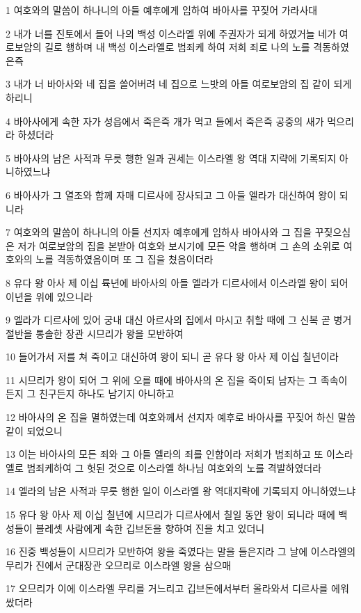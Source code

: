 \par 1 여호와의 말씀이 하나니의 아들 예후에게 임하여 바아사를 꾸짖어 가라사대
\par 2 내가 너를 진토에서 들어 나의 백성 이스라엘 위에 주권자가 되게 하였거늘 네가 여로보암의 길로 행하며 내 백성 이스라엘로 범죄케 하여 저희 죄로 나의 노를 격동하였은즉
\par 3 내가 너 바아사와 네 집을 쓸어버려 네 집으로 느밧의 아들 여로보암의 집 같이 되게 하리니
\par 4 바아사에게 속한 자가 성읍에서 죽은즉 개가 먹고 들에서 죽은즉 공중의 새가 먹으리라 하셨더라
\par 5 바아사의 남은 사적과 무릇 행한 일과 권세는 이스라엘 왕 역대 지략에 기록되지 아니하였느냐
\par 6 바아사가 그 열조와 함께 자매 디르사에 장사되고 그 아들 엘라가 대신하여 왕이 되니라
\par 7 여호와의 말씀이 하나니의 아들 선지자 예후에게 임하사 바아사와 그 집을 꾸짖으심은 저가 여로보암의 집을 본받아 여호와 보시기에 모든 악을 행하며 그 손의 소위로 여호와의 노를 격동하였음이며 또 그 집을 쳤음이더라
\par 8 유다 왕 아사 제 이십 륙년에 바아사의 아들 엘라가 디르사에서 이스라엘 왕이 되어 이년을 위에 있으니라
\par 9 엘라가 디르사에 있어 궁내 대신 아르사의 집에서 마시고 취할 때에 그 신복 곧 병거 절반을 통솔한 장관 시므리가 왕을 모반하여
\par 10 들어가서 저를 쳐 죽이고 대신하여 왕이 되니 곧 유다 왕 아사 제 이십 칠년이라
\par 11 시므리가 왕이 되어 그 위에 오를 때에 바아사의 온 집을 죽이되 남자는 그 족속이든지 그 친구든지 하나도 남기지 아니하고
\par 12 바아사의 온 집을 멸하였는데 여호와께서 선지자 예후로 바아사를 꾸짖어 하신 말씀같이 되었으니
\par 13 이는 바아사의 모든 죄와 그 아들 엘라의 죄를 인함이라 저희가 범죄하고 또 이스라엘로 범죄케하여 그 헛된 것으로 이스라엘 하나님 여호와의 노를 격발하였더라
\par 14 엘라의 남은 사적과 무릇 행한 일이 이스라엘 왕 역대지략에 기록되지 아니하였느냐
\par 15 유다 왕 아사 제 이십 칠년에 시므리가 디르사에서 칠일 동안 왕이 되니라 때에 백성들이 블레셋 사람에게 속한 깁브돈을 향하여 진을 치고 있더니
\par 16 진중 백성들이 시므리가 모반하여 왕을 죽였다는 말을 들은지라 그 날에 이스라엘의 무리가 진에서 군대장관 오므리로 이스라엘 왕을 삼으매
\par 17 오므리가 이에 이스라엘 무리를 거느리고 깁브돈에서부터 올라와서 디르사를 에워쌌더라
